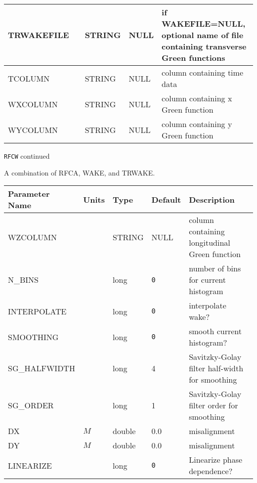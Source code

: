 \begin{tabular}{|l|l|l|l|p{\descwidth}|}
TRWAKEFILE &  & STRING &   NULL            & if WAKEFILE=NULL, optional name of file containing transverse Green functions  \\ \hline 
TCOLUMN &  & STRING &   NULL            & column containing time data  \\ \hline 
WXCOLUMN &  & STRING &   NULL            & column containing x Green function  \\ \hline 
WYCOLUMN &  & STRING &   NULL            & column containing y Green function  \\ \hline 
\end{tabular}

\begin{latexonly}
\newpage
\begin{center}{\Large\verb|RFCW| continued}\end{center}
\end{latexonly}
A combination of RFCA, WAKE, and TRWAKE.
\\
\begin{tabular}{|l|l|l|l|p{\descwidth}|} \hline
Parameter Name & Units & Type & Default & Description \\ \hline 
WZCOLUMN &  & STRING &   NULL            & column containing longitudinal Green function  \\ \hline 
N\_BINS &  & long &  \verb|0| & number of bins for current histogram  \\ \hline 
INTERPOLATE &  & long &  \verb|0| & interpolate wake?  \\ \hline 
SMOOTHING &  & long &  \verb|0| & smooth current histogram?  \\ \hline 
SG\_HALFWIDTH &  & long &   4               & Savitzky-Golay filter half-width for smoothing  \\ \hline 
SG\_ORDER &  & long &   1               & Savitzky-Golay filter order for smoothing  \\ \hline 
DX & $M$ & double &  0.0 & misalignment  \\ \hline 
DY & $M$ & double &  0.0 & misalignment  \\ \hline 
LINEARIZE &  & long &  \verb|0| & Linearize phase dependence?  \\ \hline 
\end{tabular}

